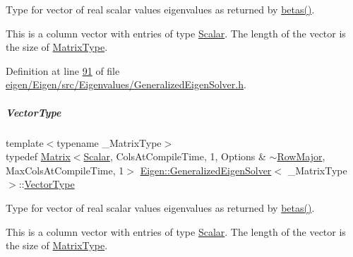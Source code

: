 Type for vector of real scalar values eigenvalues as returned by \hyperlink{group___eigenvalues___module_abeaa6f56cee367b83fd09d428462ca0c}{betas()}. 

This is a column vector with entries of type \hyperlink{group___eigenvalues___module_afb318d0b097ff8dd5a7410d31317ca47}{Scalar}. The length of the vector is the size of \hyperlink{group___eigenvalues___module_a56f4b9823bb9a267de3aaf48428cd247}{Matrix\+Type}. 

Definition at line \hyperlink{eigen_2_eigen_2src_2_eigenvalues_2_generalized_eigen_solver_8h_source_l00091}{91} of file \hyperlink{eigen_2_eigen_2src_2_eigenvalues_2_generalized_eigen_solver_8h_source}{eigen/\+Eigen/src/\+Eigenvalues/\+Generalized\+Eigen\+Solver.\+h}.

\mbox{\label{group___eigenvalues___module_a5aa3d1390c2b0d455c1c9b8b3101b119}} 
\subparagraph{\texorpdfstring{Vector\+Type}{VectorType}\hspace{0.1cm}{\footnotesize\ttfamily [2/2]}}
{\footnotesize\ttfamily template$<$typename \+\_\+\+Matrix\+Type$>$ \\
typedef \hyperlink{group___core___module_class_eigen_1_1_matrix}{Matrix}$<$\hyperlink{group___eigenvalues___module_afb318d0b097ff8dd5a7410d31317ca47}{Scalar}, Cols\+At\+Compile\+Time, 1, Options \& $\sim$\hyperlink{group__enums_ggaacded1a18ae58b0f554751f6cdf9eb13acfcde9cd8677c5f7caf6bd603666aae3}{Row\+Major}, Max\+Cols\+At\+Compile\+Time, 1$>$ \hyperlink{group___eigenvalues___module_class_eigen_1_1_generalized_eigen_solver}{Eigen\+::\+Generalized\+Eigen\+Solver}$<$ \+\_\+\+Matrix\+Type $>$\+::\hyperlink{group___eigenvalues___module_a5aa3d1390c2b0d455c1c9b8b3101b119}{Vector\+Type}}



Type for vector of real scalar values eigenvalues as returned by \hyperlink{group___eigenvalues___module_abeaa6f56cee367b83fd09d428462ca0c}{betas()}. 

This is a column vector with entries of type \hyperlink{group___eigenvalues___module_afb318d0b097ff8dd5a7410d31317ca47}{Scalar}. The length of the vector is the size of \hyperlink{group___eigenvalues___module_a56f4b9823bb9a267de3aaf48428cd247}{Matrix\+Type}. 


